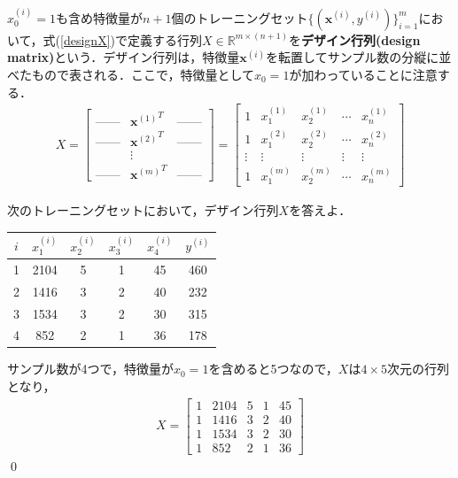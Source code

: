 \begin{defi}[デザイン行列]
$x_0^{(i)}=1$も含め特徴量が$n+1$個のトレーニングセット$\{({\bm x}^{(i)},y^{(i)})\}_{i=1}^m$において，式(\ref{designX})で定義する行列$X \in \mathbb{R}^{m\times (n+1)}$を{\bf デザイン行列(design matrix)}という．デザイン行列は，特徴量${\bm x}^{(i)}$を転置してサンプル数の分縦に並べたもので表される．ここで，特徴量として$x_0=1$が加わっていることに注意する．
\begin{align}
X = 
\begin{bmatrix}
\mbox{------} & {{\bm x}^{(1)}}^T & \mbox{------} \\
\mbox{------} & {{\bm x}^{(2)}}^T & \mbox{------} \\
 & \vdots & \\
\mbox{------} & {{\bm x}^{(m)}}^T & \mbox{------}
\end{bmatrix}
=
\begin{bmatrix}
1 & x_1^{(1)} & x_2^{(1)} & \cdots & x_n^{(1)} \\
1 & x_1^{(2)} & x_2^{(2)} & \cdots & x_n^{(2)} \\
\vdots & \vdots & \vdots & \vdots & \vdots \\
1 & x_1^{(m)} & x_2^{(m)} & \cdots & x_n^{(m)} 
\end{bmatrix} \label{designX}
\end{align}
\end{defi}

\begin{qu}
次のトレーニングセットにおいて，デザイン行列$X$を答えよ．
\begin{table}[H]
\centering
\begin{tabular}{cccccc}
\hline
$i$ &$x_1^{(i)}$ &$x_2^{(i)}$ &$x_3^{(i)}$ &$x_4^{(i)}$ & $y^{(i)}$ \\ \hline
1 & 2104 & 5 & 1 & 45 & 460 \\
2 & 1416 & 3 & 2 & 40 & 232 \\
3 & 1534 & 3 & 2 & 30 & 315 \\
4 & 852  & 2 & 1 & 36 & 178 \\ \hline
\end{tabular}
\end{table}
\end{qu}
\begin{ans}
サンプル数が4つで，特徴量が$x_0=1$を含めると5つなので，$X$は$4\times 5$次元の行列となり，
\begin{align*}
X=
\begin{bmatrix}
1 & 2104 & 5 & 1 & 45 \\
1 & 1416 & 3 & 2 & 40 \\
1 & 1534 & 3 & 2 & 30 \\
1 & 852  & 2 & 1 & 36 
\end{bmatrix}
\end{align*}\qed
\end{ans}

